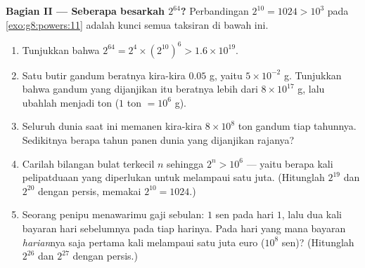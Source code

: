 \begin{problem}[{Soal akhir pekan --- \omterm{def:g1:addition:def}{jumlah} geometri
$1 + 2 + 4 + \dots + 2^{n-1} = 2^n - 1$, dari legenda yang terkenal
sampai bilangan biner}]
\medskip
\noindent\textbf{Bagian II --- Seberapa besarkah $2^{64}$?}
Perbandingan $2^{10} = 1024 > 10^3$ pada
\cref{exo:g8:powers:11} adalah kunci semua taksiran di bawah ini.
\begin{enumerate}[resume]
  \item Tunjukkan bahwa
        $2^{64} = 2^4 \times \left(2^{10}\right)^6 > 1.6 \times
        10^{19}$.
  \item Satu butir gandum beratnya kira-kira $0.05$ g, yaitu
        $5 \times 10^{-2}$ g. Tunjukkan bahwa gandum yang dijanjikan
        itu beratnya lebih dari $8 \times 10^{17}$ g, lalu ubahlah
        menjadi ton ($1$ ton $= 10^6$ g).
  \item Seluruh dunia saat ini memanen kira-kira $8 \times 10^8$
        ton gandum tiap tahunnya. Sedikitnya berapa tahun panen
        dunia yang dijanjikan rajanya?
  \item Carilah bilangan bulat terkecil $n$ sehingga
        $2^n > 10^6$ --- yaitu berapa kali pelipatduaan yang
        diperlukan untuk melampaui satu juta. (Hitunglah $2^{19}$
        dan $2^{20}$ dengan persis, memakai $2^{10} = 1024$.)
  \item Seorang penipu menawarimu gaji sebulan: $1$ sen pada hari
        $1$, lalu dua kali bayaran hari sebelumnya pada tiap
        harinya. Pada hari yang mana bayaran \emph{harian}nya saja
        pertama kali melampaui satu juta euro ($10^8$ sen)?
        (Hitunglah $2^{26}$ dan $2^{27}$ dengan persis.)
\end{enumerate}


\end{problem}
